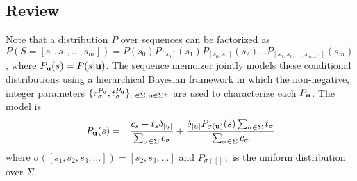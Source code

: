 \subsection{Review}

Note that a distribution $P$ over sequences can be factorized as $P(S = [s_0, s_1, \ldots, s_m]) = P(s_0)P_{[s_0]}(s_1)P_{[s_0,s_1]}(s_2) \ldots P_{[s_0,s_1,\ldots,s_{m-1}]}(s_m)$, where $P_{\bf u}(s) = P(s | {\bf u})$.  The sequence memoizer \citep{Wood2009} jointly models these conditional distributions using a hierarchical Bayesian framework in which the non-negative, integer parameters $\{ c^{P_{\bf u}}_\sigma, t^{P_{\bf u}}_\sigma \}_{\sigma \in \Sigma, {\bf u} \in \Sigma^{+}}$ are used to characterize each $P_{\bf u }$.  The model is
%
\begin{eqnarray*}
	P_{\bf u}(s) &=& \frac{c_s - t_s \delta_{|u|} }{\sum_{\sigma \in \Sigma} c_\sigma} +  \frac{\delta_{|u|} P_{ \sigma({\bf u})}(s) \sum_{\sigma \in \Sigma} t_\sigma}{\sum_{\sigma \in \Sigma} c_\sigma} \\
\end{eqnarray*}
%
\noindent where $\sigma([s_1, s_2, s_3, \ldots]) = [s_2,s_3, \ldots]$ and $P_{\sigma([])}$ is the uniform distribution over $\Sigma$.


